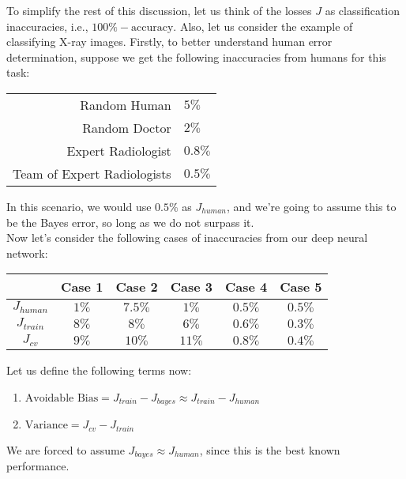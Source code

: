 \documentclass[a4paper, 12pt]{report}
\begin{document}
\break
To simplify the rest of this discussion, let us think of the losses $J$ as classification inaccuracies, i.e., $100\% - \text{accuracy}$. Also, let us consider the example of classifying X-ray images. Firstly, to better understand human error determination, suppose we get the following inaccuracies from humans for this task:
\begin{table}[H]
\centering
\begin{tabular}{| r | l |}
\hline
Random Human & $5\%$ \\
Random Doctor & $2\%$ \\
Expert Radiologist & $0.8\%$ \\
Team of Expert Radiologists & $0.5\%$ \\
\hline
\end{tabular}
\end{table}
In this scenario, we would use $0.5\%$ as $J_{human}$, and we're going to assume this to be the Bayes error, so long as we do not surpass it.\\
\break
Now let's consider the following cases of inaccuracies from our deep neural network:
\begin{table}[H]
\centering
\begin{tabular}{| c | c | c | c | c | c |}
\hline
& Case 1 & Case 2 & Case 3 & Case 4 & Case 5\\
\hline
$J_{human}$ & $1\%$ & $7.5\%$ & $1\%$ & $0.5\%$ & $0.5\%$\\
\hline
$J_{train}$ & $8\%$ & $8\%$ & $6\%$ & $0.6\%$ & $0.3\%$\\
\hline
$J_{cv}$ & $9\%$ & $10\%$ & $11\%$ & $0.8\%$ & $0.4\%$\\
\hline
\end{tabular}
\end{table}
Let us define the following terms now:
\begin{enumerate}
\item $\text{Avoidable Bias} = J_{train} - J_{bayes} \approx J_{train} - J_{human}$
\item $\text{Variance} = J_{cv} - J_{train}$
\end{enumerate}
We are forced to assume $J_{bayes} \approx J_{human}$, since this is the best known performance.
\end{document}
